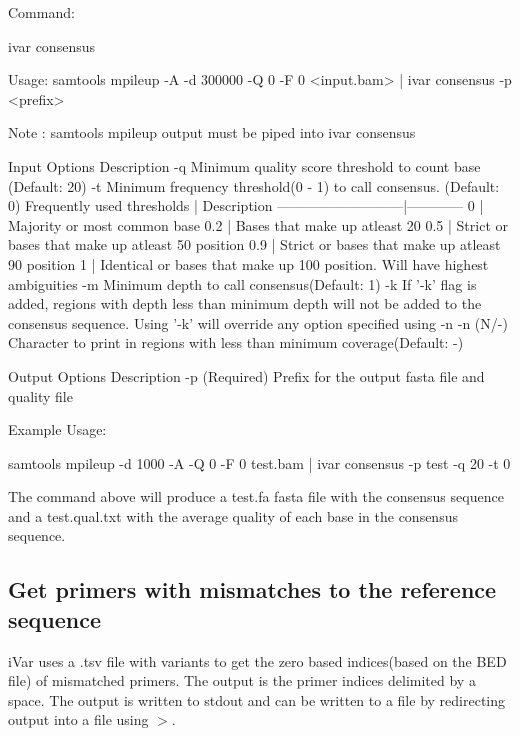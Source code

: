 Command\+: 
\begin{DoxyCode}
ivar consensus

Usage: samtools mpileup -A -d 300000 -Q 0 -F 0 <input.bam> | ivar consensus -p <prefix>

Note : samtools mpileup output must be piped into ivar consensus

Input Options    Description
           -q    Minimum quality score threshold to count base (Default: 20)
           -t    Minimum frequency threshold(0 - 1) to call consensus. (Default: 0)
                 Frequently used thresholds | Description
                 ---------------------------|------------
                                          0 | Majority or most common base
                                        0.2 | Bases that make up atleast 20%
                                        0.5 | Strict or bases that make up atleast 50%
       position
                                        0.9 | Strict or bases that make up atleast 90%
       position
                                          1 | Identical or bases that make up 100%
       position. Will have highest ambiguities
           -m    Minimum depth to call consensus(Default: 1)
           -k    If '-k' flag is added, regions with depth less than minimum depth will not be added to the
       consensus sequence. Using '-k' will override any option specified using -n
           -n    (N/-) Character to print in regions with less than minimum coverage(Default: -)

Output Options   Description
           -p    (Required) Prefix for the output fasta file and quality file
\end{DoxyCode}


Example Usage\+: 
\begin{DoxyCode}
samtools mpileup -d 1000 -A -Q 0 -F 0 test.bam | ivar consensus -p test -q 20 -t 0
\end{DoxyCode}


The command above will produce a test.\+fa fasta file with the consensus sequence and a test.\+qual.\+txt with the average quality of each base in the consensus sequence.\hypertarget{manualpage_autotoc_md6}{}\subsection{Get primers with mismatches to the reference sequence}\label{manualpage_autotoc_md6}
i\+Var uses a .tsv file with variants to get the zero based indices(based on the B\+E\+D file) of mismatched primers. The output is the primer indices delimited by a space. The output is written to stdout and can be written to a file by redirecting output into a file using {\ttfamily $>$}.


